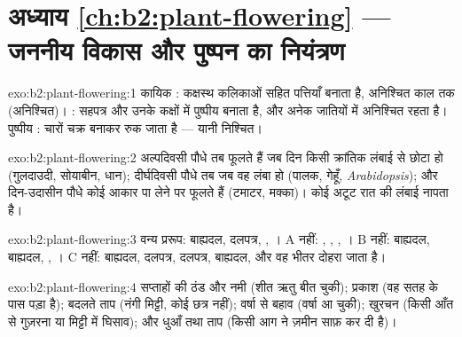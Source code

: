 \section*{अध्याय \ref{ch:b2:plant-flowering} --- जननीय विकास और पुष्पन का नियंत्रण}

\begin{solution}{exo:b2:plant-flowering:1}
कायिक : कक्षस्थ कलिकाओं सहित पत्तियाँ बनाता है, अनिश्चित काल तक
(अनिश्चित)। : सहपत्र और उनके कक्षों में पुष्पीय
 बनाता है, और अनेक जातियों में अनिश्चित रहता है। पुष्पीय
: चारों चक्र बनाकर रुक जाता है --- यानी निश्चित।
\end{solution}

\begin{solution}{exo:b2:plant-flowering:2}
अल्पदिवसी पौधे तब फूलते हैं जब दिन किसी क्रांतिक लंबाई से छोटा हो
(गुलदाउदी, सोयाबीन, धान); दीर्घदिवसी पौधे तब जब वह
लंबा हो (पालक, गेहूँ, \emph{Arabidopsis}); और दिन-उदासीन पौधे
कोई आकार पा लेने पर फूलते हैं (टमाटर, मक्का)। कोई 
अटूट रात की लंबाई नापता है।
\end{solution}

\begin{solution}{exo:b2:plant-flowering:3}
वन्य प्ररूप: बाह्यदल, दलपत्र, , । A नहीं: , ,
, । B नहीं: बाह्यदल, बाह्यदल, , । C नहीं: बाह्यदल,
दलपत्र, दलपत्र, बाह्यदल, और वह  भीतर दोहरा जाता है।
\end{solution}

\begin{solution}{exo:b2:plant-flowering:4}
सप्ताहों की ठंड और नमी (शीत ऋतु बीत चुकी); प्रकाश (वह  सतह के
पास पड़ा है); बदलते ताप (नंगी मिट्टी, कोई छत्र नहीं);
वर्षा से बहाव (वर्षा आ चुकी); खुरचन (किसी आँत से गुज़रना या
मिट्टी में घिसाव); और धुआँ तथा ताप (किसी आग ने ज़मीन साफ़ कर दी है)।
\end{solution}

